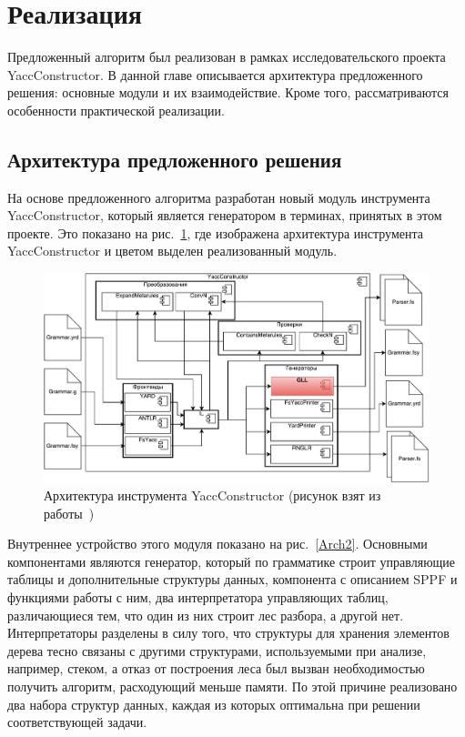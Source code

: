 \section{Реализация}
Предложенный алгоритм был реализован в рамках исследовательского проекта YaccConstructor. В данной главе описывается архитектура предложенного решения: основные модули и их взаимодействие. Кроме того, рассматриваются особенности практической реализации.

\subsection{Архитектура предложенного решения}
На основе предложенного алгоритма разработан новый модуль инструмента YaccConstructor, который является генератором в терминах, принятых в этом проекте. Это показано на рис.~\ref{Arch}, где изображена архитектура инструмента YaccConstructor и цветом выделен реализованный модуль.

\begin{figure}[h]
 \centering
 \includegraphics[width=\textwidth]{Ragozina/pics/Arch.pdf}
 \caption{Архитектура инструмента YaccConstructor (рисунок взят из работы~\cite{GrigorievPhd})}
 \label{Arch}
\end{figure}

Внутреннее устройство этого модуля показано на рис.~\ref{Arch2}. Основными компонентами являются генератор, который по грамматике строит управляющие таблицы и дополнительные структуры данных, компонента с описанием SPPF и функциями работы с ним, два интерпретатора управляющих таблиц, различающиеся тем, что один из них строит лес разбора, а другой нет. Интерпретаторы разделены в силу того, что структуры для хранения элементов дерева тесно связаны с другими структурами, используемыми при анализе, например, стеком, а отказ от построения леса был вызван необходимостью получить алгоритм, расходующий меньше памяти. По этой причине реализовано два набора структур данных, каждая из которых оптимальна при решении соответствующей задачи.

